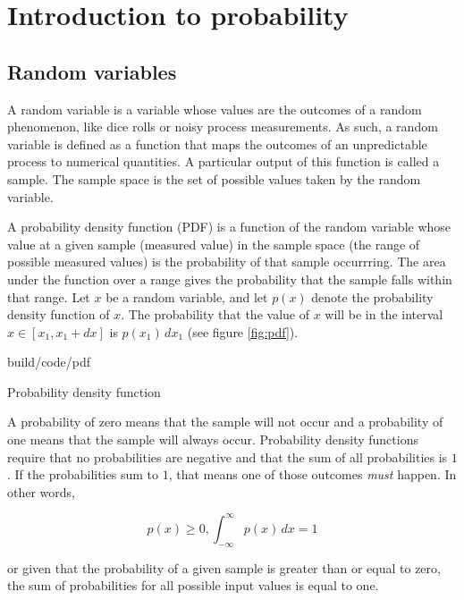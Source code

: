 \section{Introduction to probability}

\subsection{Random variables}

A random variable is a variable whose values are the outcomes of a random
phenomenon, like dice rolls or noisy process measurements. As such, a random
variable is defined as a function that maps the outcomes of an unpredictable
process to numerical quantities. A particular output of this function is called
a sample. The sample space is the set of possible values taken by the random
variable.

A probability density function (PDF) is a function of the random variable whose
value at a given sample (measured value) in the sample space (the range of
possible measured values) is the probability of that sample occurrring. The area
under the function over a range gives the probability that the sample falls
within that range. Let $x$ be a random variable, and let $p(x)$ denote the
probability density function of $x$. The probability that the value of $x$ will
be in the interval $x \in [x_1, x_1 + dx]$ is $p(x_1) \,dx_1$ (see figure
\ref{fig:pdf}).

\begin{svg}{build/code/pdf}
  \caption{Probability density function}
  \label{fig:pdf}
\end{svg}

A probability of zero means that the sample will not occur and a probability of
one means that the sample will always occur. Probability density functions
require that no probabilities are negative and that the sum of all probabilities
is $1$. If the probabilities sum to $1$, that means one of those outcomes
\textit{must} happen. In other words,

\begin{equation*}
  p(x) \geq 0, \int_{-\infty}^\infty p(x) \,dx = 1
\end{equation*}

or given that the probability of a given sample is greater than or equal to
zero, the sum of probabilities for all possible input values is equal to one.


